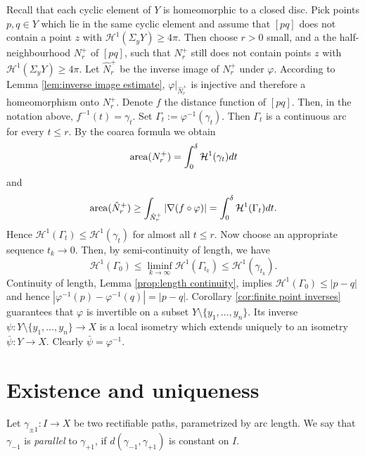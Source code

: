 \documentclass[a4paper,10pt]{amsart}
\begin{document}
Recall that each cyclic element of $Y$ is homeomorphic to a closed disc. 
Pick points $p,q\in Y$ which lie in the same cyclic element and assume that
$[pq]$ does not contain a point $z$ with $\mathcal{H}^1(\Sigma_y Y)\geq 4\pi$.
Then choose $r>0$ small, and a the half-neighbourhood $N_r^+$ of $[pq]$, 
such that $N_r^+$ still does not contain points $z$ with 
$\mathcal{H}^1(\Sigma_y Y)\geq 4\pi$. Let $\hat N_r^+$ be the inverse image of $N_r^+$
under $\varphi$. According to Lemma \ref{lem:inverse image estimate}, $\varphi|_{\hat N_r^+}$ 
is injective and therefore a homeomorphism onto $N_r^+$. 
Denote $f$ the distance function of $[pq]$. Then, in the notation above, $f^{-1}(t)=\gamma_t$.
Set $\Gamma_t:=\varphi^{-1}(\gamma_t)$. Then $\Gamma_t$ is a continuous arc for every $t\leq r$.
By the coarea formula we obtain
$$
\mathop{\rm area}\nolimits(N_r^+)=\int_0^\delta \mathcal{H}^1(\gamma_t)dt
$$
and
$$
\mathop{\rm area}\nolimits(\hat N_r^+)\geq\int_{\hat N_r^+}|\nabla (f\circ\varphi)|=\int_0^\delta \mathcal{H}^1(\Gamma_t)dt.
$$
Hence $\mathcal{H}^1(\Gamma_t)\leq \mathcal{H}^1(\gamma_t)$ for almost all $t\leq r$.
Now choose an appropriate sequence $t_k\to 0$. Then, by semi-continuity of length, we have
$$
\mathcal{H}^1(\Gamma_0)\leq \liminf_{k\to\infty}\mathcal{H}^1(\Gamma_{t_k})\leq\mathcal{H}^1(\gamma_{t_k}).
$$
Continuity of length, Lemma \ref{prop:length continuity}, implies
$\mathcal{H}^1(\Gamma_0)\leq|p-q|$ and hence $|\varphi^{-1}(p)-\varphi^{-1}(q)|=|p-q|$. 
Corollary \ref{cor:finite point inverses} guarantees that $\varphi$ is invertible on a subset 
$Y\setminus\{y_1,\ldots,y_n\}$. Its inverse $\psi:Y\setminus\{y_1,\ldots,y_n\}\to X$ is a local
isometry which extends uniquely to an isometry $\bar\psi:Y\to X$. Clearly $\bar\psi=\varphi^{-1}$.
\qeds











\section{Existence and uniqueness}

Let $\gamma_{\pm 1}:I\to X$ be two rectifiable paths, parametrized by arc length. We say that  $\gamma_{-1}$ is {\em parallel} to $\gamma_{+1}$, if $d(\gamma_{-1},\gamma_{+1})$
is constant on $I$.
\end{document}
